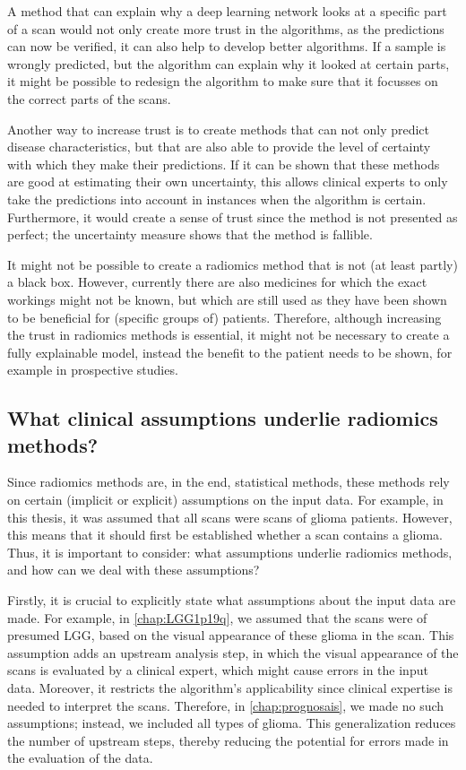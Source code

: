 A method that can explain why a deep learning network looks at a specific part of a scan would not only create more trust in the algorithms, as the predictions can now be verified, it can also help to develop better algorithms.
If a sample is wrongly predicted, but the algorithm can explain why it looked at certain parts, it might be possible to redesign the algorithm to make sure that it focusses on the correct parts of the scans.

Another way to increase trust is to create methods that can not only predict disease characteristics, but that are also able to provide the level of certainty with which they make their predictions.
If it can be shown that these methods are good at estimating their own uncertainty, this allows clinical experts to only take the predictions into account in instances when the algorithm is certain.
Furthermore, it would create a sense of trust since the method is not presented as perfect; the uncertainty measure shows that the method is fallible.

It might not be possible to create a radiomics method that is not (at least partly) a black box.
However, currently there are also medicines for which the exact workings might not be known, but which are still used as they have been shown to be beneficial for (specific groups of) patients.
Therefore, although increasing the trust in radiomics methods is essential, it might not be necessary to create a fully explainable model, instead the benefit to the patient needs to be shown, for example in prospective studies.


\subsection{What clinical assumptions underlie radiomics methods?}

Since radiomics methods are, in the end, statistical methods, these methods rely on certain (implicit or explicit) assumptions on the input data.
For example, in this thesis, it was assumed that all scans were scans of glioma patients.
However, this means that it should first be established whether a scan contains a glioma.
Thus, it is important to consider: what assumptions underlie radiomics methods, and how can we deal with these assumptions?

Firstly, it is crucial to explicitly state what assumptions about the input data are made.
For example, in \cref{chap:LGG1p19q}, we assumed that the scans were of presumed \gls{LGG}, based on the visual appearance of these glioma in the scan.
This assumption adds an upstream analysis step, in which the visual appearance of the scans is evaluated by a clinical expert, which might cause errors in the input data.
Moreover, it restricts the algorithm's applicability since clinical expertise is needed to interpret the scans.
Therefore, in \cref{chap:prognosais}, we made no such assumptions; instead, we included all types of glioma.
This generalization reduces the number of upstream steps, thereby reducing the potential for errors made in the evaluation of the data.

